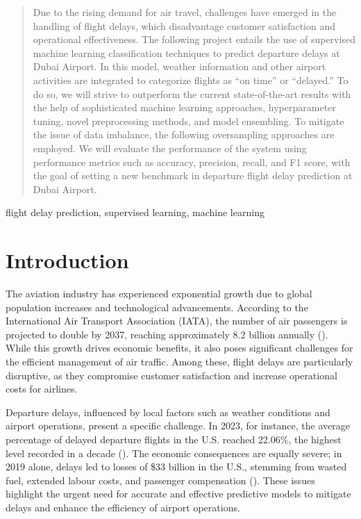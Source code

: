 \documentclass[twoside,11pt]{article}
\begin{document}
\begin{abstract}%
Due to the rising demand for air travel, challenges have emerged in the handling of flight delays, which disadvantage customer satisfaction and operational effectiveness. The following project entails the use of supervised machine learning classification techniques to predict departure delays at Dubai Airport. In this model, weather information and other airport activities are integrated to categorize flights as “on time” or “delayed.” To do so, we will strive to outperform the current state-of-the-art results with the help of sophisticated machine learning approaches, hyperparameter tuning, novel preprocessing methods, and model ensembling. To mitigate the issue of data imbalance, the following oversampling approaches are employed. We will evaluate the performance of the system using performance metrics such as accuracy, precision, recall, and F1 score, with the goal of setting a new benchmark in departure flight delay prediction at Dubai Airport. 
\end{abstract}

\begin{keywords}
  flight delay prediction, supervised learning, machine learning
\end{keywords}

\section{Introduction}

The aviation industry has experienced exponential growth due to global population increases and technological advancements. According to the International Air Transport Association (IATA), the number of air passengers is projected to double by 2037, reaching approximately 8.2 billion annually (\citealp{bart2024}). While this growth drives economic benefits, it also poses significant challenges for the efficient management of air traffic. Among these, flight delays are particularly disruptive, as they compromise customer satisfaction and increase operational costs for airlines. 

Departure delays, influenced by local factors such as weather conditions and airport operations, present a specific challenge. In 2023, for instance, the average percentage of delayed departure flights in the U.S. reached 22.06\%, the highest level recorded in a decade (\citealp{usAirlineSawRecord}). The economic consequences are equally severe; in 2019 alone, delays led to losses of \$33 billion in the U.S., stemming from wasted fuel, extended labour costs, and passenger compensation (\citealp{aA2024}). These issues highlight the urgent need for accurate and effective predictive models to mitigate delays and enhance the efficiency of airport operations. 
\end{document}
